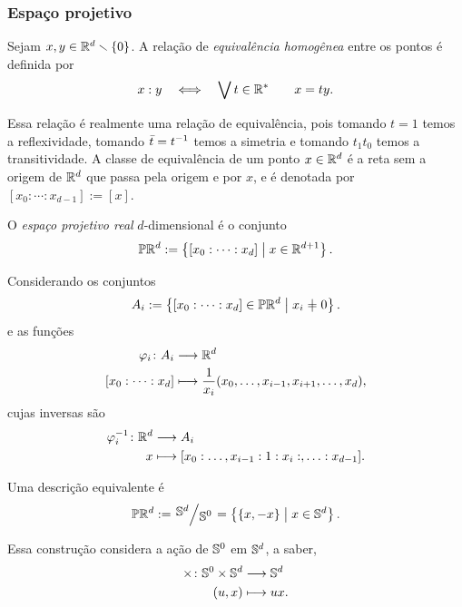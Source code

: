 \subsubsection{Espaço projetivo}

\begin{definition}
Sejam $x,y \in \R^d\setminus\{0\}$. A relação de \emph{equivalência homogênea} entre os pontos é definida por
	\begin{equation*}
	x : y \sse \exists t \in \R^* \qquad x = ty.
	\end{equation*}
\end{definition}

Essa relação é realmente uma relação de equivalência, pois tomando $t=1$ temos a reflexividade, tomando $\bar t = t\inv$ temos a simetria e tomando $t_1t_0$ temos a transitividade. A classe de equivalência de um ponto $x \in \R^d$ é a reta sem a origem de $\R^d$ que passa pela origem e por $x$, e é denotada por $[x_0 : \cdots : x_{d-1}] := [x]$.

\begin{definition}
O \emph{espaço projetivo real} $d$-dimensional é o conjunto
	\begin{equation*}
	\pro\R^d := \set{[x_0 : \cdots : x_d]}{x \in \R^{d+1}}.
	\end{equation*}
\end{definition}

Considerando os conjuntos
	\begin{equation*}
	A_i := \set{[x_0 : \cdots : x_d] \in \pro\R^d}{x_i \neq 0}.
	\end{equation*}
e as funções
	\begin{align*}
	\func{\varphi_i}{A_i}{\R^d}{[x_0 : \cdots : x_d]}{\frac{1}{x_i}(x_0,\ldots,x_{i-1},x_{i+1},\ldots,x_d)},
	\end{align*}
cujas inversas são
	\begin{align*}
	\func{\varphi_i\inv}{\R^d}{A_i}{x}{[x_0:\ldots,x_{i-1}:1:x_i:,\ldots:x_{d-1}]}.
	\end{align*}

Uma descrição equivalente é
	\begin{equation*}
	\pro\R^d := \quo{\S^d}{\S^0} = \set{\{x,-x\}}{x \in \S^d}.
	\end{equation*}

Essa construção considera a ação de $\S^0$ em $\S^d$, a saber,
	\begin{align*}
	\func{\times}{\S^0 \times \S^d}{\S^d}{(u,x)}{ux}.
	\end{align*}

